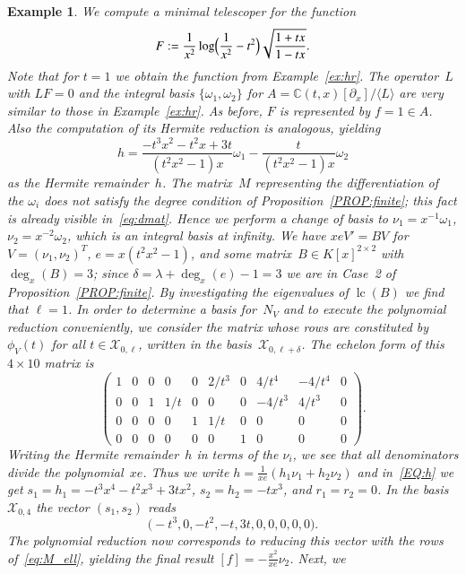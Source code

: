 \documentclass[final,1p,times,authoryear]{elsarticle}
\newtheorem{example}[theorem]{Example}
\def\<#1>{\langle#1\rangle}
\newcommand{\bC}{ {\mathbb C}}
\newcommand{\cX}{ {\mathcal X}}
\def\lc{\operatorname{lc}}
\begin{document}
\begin{example}
We compute a minimal telescoper for the function
\[
  F := \frac{1}{x^2} \log\Bigl(\frac{1}{x^2}-t^2\Bigr)\sqrt{\frac{1+tx}{1-tx}}.
\]
Note that for $t=1$ we
obtain the function from Example~\ref{ex:hr}. The operator~$L$ with $LF=0$
and the integral basis $\{\omega_1,\omega_2\}$ for
$A=\bC(t,x)[\partial_x]/\<L>$ are very similar to those in Example~\ref{ex:hr}.
As before, $F$ is represented by $f=1\in A$.
Also the computation of its Hermite reduction is analogous, yielding
\[
  h = \frac{-t^3x^2-t^2x+3t}{(t^2x^2-1)x} \omega_1 - \frac{t}{(t^2x^2-1)x} \omega_2
\]
as the Hermite remainder~$h$. The matrix~$M$ representing the differentiation
of the $\omega_i$ does not satisfy the degree condition of
Proposition~\ref{PROP:finite}; this fact is already visible
in~\eqref{eq:dmat}. Hence we perform a change of basis to
$\nu_1=x^{-1}\omega_1$, $\nu_2=x^{-2}\omega_2$, which is an integral basis at
infinity. We have $xeV'=BV$ for $V=(\nu_1,\nu_2)^T$, $e=x(t^2x^2-1)$, and
some matrix~$B\in K[x]^{2\times2}$ with $\deg_x(B)=3$; since
$\delta=\lambda+\deg_x(e)-1=3$ we are in Case~2 of
Proposition~\ref{PROP:finite}.  By investigating the eigenvalues of $\lc(B)$
we find that $\ell=1$. In order to determine a basis for~$N_V$ and to execute
the polynomial reduction conveniently, we consider the matrix whose rows are
constituted by $\phi_V(t)$ for all $t\in\cX_{0,\ell}$, written in the
basis~$\cX_{0,\ell+\delta}$. The echelon form of this $4\times10$ matrix is
\begin{equation}\label{eq:M_ell}
  \begin{pmatrix}
  1 & 0 & 0 & 0 & 0 & 2/t^3 & 0 & 4/t^4 & -4/t^4 & 0 \\
  0 & 0 & 1 & 1/t & 0 & 0 & 0 & -4/t^3 & 4/t^3 & 0 \\
  0 & 0 & 0 & 0 & 1 & 1/t & 0 & 0 & 0 & 0 \\
  0 & 0 & 0 & 0 & 0 & 0 & 1 & 0 & 0 & 0
  \end{pmatrix}.
\end{equation}
Writing the Hermite remainder~$h$ in terms of the $\nu_i$, we see that all
denominators divide the polynomial~$xe$. Thus we write
$h=\frac{1}{xe}(h_1\nu_1+h_2\nu_2)$ and in~\eqref{EQ:h} we get
$s_1=h_1=-t^3x^4-t^2x^3+3tx^2$, $s_2=h_2=-tx^3$, and $r_1=r_2=0$.
In the basis $\cX_{0,4}$ the vector $(s_1,s_2)$ reads
\[
  \bigl(-t^3, 0, -t^2, -t, 3 t, 0, 0, 0, 0, 0\bigr).
\]
The polynomial reduction now corresponds to reducing this vector with the rows
of~\eqref{eq:M_ell}, yielding the final result $[f]=-\frac{x^2}{xe}\nu_2$.  Next, we

\end{example}
\end{document}
